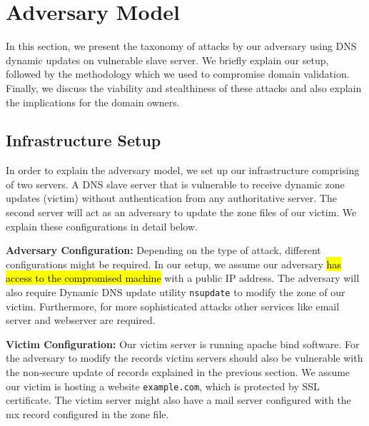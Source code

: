 \section{Adversary Model}

In this section, we present the taxonomy of attacks by our adversary using DNS dynamic updates on vulnerable slave server. We briefly explain our setup, followed by the methodology which we used to compromise domain validation. Finally, we discuss the viability and stealthiness of these attacks and also explain the implications for the domain owners. 


\subsection{Infrastructure Setup}

In order to explain the adversary model, we set up our infrastructure comprising of two servers. A DNS slave server that is vulnerable to receive  dynamic zone updates (victim) without authentication from any authoritative server. The second server will act as an adversary to update the zone files of our victim.  We explain these configurations in detail below. 


\textbf{Adversary Configuration:} Depending on the type of attack, different configurations might be required. In our setup, we assume our adversary \hl{has access to the compromised machine}  with a public IP address. The adversary will also require Dynamic DNS update utility \texttt{nsupdate} to modify the zone of our victim. Furthermore, for more sophisticated attacks other services like email server and webserver are required. %

\textbf{Victim Configuration:} Our victim server is running apache bind software. For the adversary to modify the records victim servers should also be vulnerable with the non-secure update of records explained in the previous section. We assume our victim is hosting a website \texttt{example.com}, which is protected by SSL certificate. The victim server might also have a mail server configured with the mx record configured in the zone file.  


